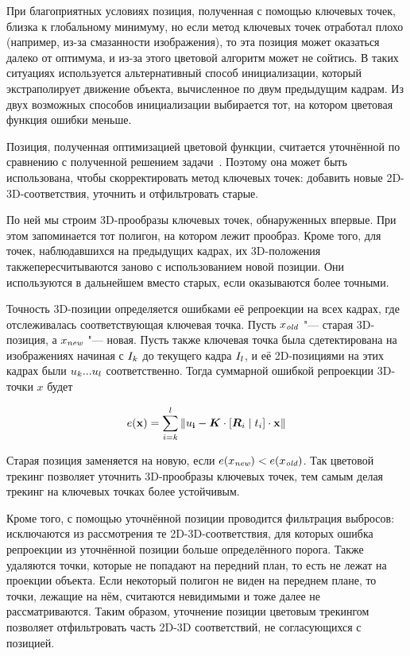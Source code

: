 При благоприятных условиях позиция, полученная с помощью ключевых точек, близка
к глобальному минимуму, но если метод ключевых точек отработал плохо (например,
из-за
смазанности изображения), то эта позиция может оказаться далеко от оптимума, и
из-за этого цветовой алгоритм может не сойтись.
В таких ситуациях используется альтернативный способ инициализации, который
экстраполирует движение объекта, вычисленное по двум предыдущим кадрам.
Из двух возможных способов инициализации выбирается тот, на котором цветовая
функция ошибки меньше.

Позиция, полученная оптимизацией цветовой функции, считается уточнённой по
сравнению с полученной решением задачи~\PnP.
Поэтому она может быть использована, чтобы скорректировать метод ключевых
точек: добавить новые 2D-3D-соответствия, уточнить и отфильтровать старые.

По ней мы строим 3D-прообразы ключевых точек, обнаруженных впервые.
При этом запоминается тот полигон, на котором лежит прообраз.
Кроме того, для точек, наблюдавшихся на предыдущих кадрах, их 3D-положения такжепересчитываются заново с использованием новой позиции.
Они используются в дальнейшем вместо старых, если оказываются более точными.

Точность 3D-позиции определяется ошибками её репроекции на всех кадрах, где
отслеживалась соответствующая ключевая точка.
Пусть $\mathnormal{x_{\text {\it old}}}$ "--- старая 3D-позиция, а $\mathnormal{x_{\text{\it new}}}$ "--- новая. 
Пусть также ключевая точка была сдетектирована на изображениях начиная с
$I_k$
до текущего кадра $I_l$, и её 2D-позициями на этих кадрах были $\mathnormal{u}_k ...
\mathnormal{u}_l$
соответственно.
Тогда суммарной ошибкой репроекции 3D-точки $x$ будет

\begin{equation}
\label{eqn:sum_reproj}
\mathnormal{e}( \mathbf{x} ) = \sum\limits_{i = k}^l \| \mathbf{\mathnormal{u}_i} - \bm{K} \cdot
[\bm{R}_i \mid \mathnormal{t}_i] \cdot \mathbf{x} \|
\end{equation}

Старая позиция заменяется на новую, если $\mathnormal{e}( \mathnormal{x_{\text{\it new}}} ) < \mathnormal{e}( \mathnormal{x_{\text {\it old}}} )$.
Так цветовой трекинг позволяет уточнить 3D-прообразы ключевых точек, тем самым
делая трекинг на ключевых точках более устойчивым.

Кроме того, с помощью уточнённой позиции проводится фильтрация выбросов:
исключаются из рассмотрения те 2D-3D-соответствия, для которых ошибка
репроекции из уточнённой позиции больше определённого порога.
Также удаляются точки, которые не попадают на передний план, то есть не лежат
на проекции объекта.
Если некоторый полигон не виден на переднем плане, то точки, лежащие на нём,
считаются невидимыми и тоже далее не рассматриваются.
Таким образом, уточнение позиции цветовым трекингом позволяет отфильтровать
часть 2D-3D соответствий, не согласующихся с позицией.


